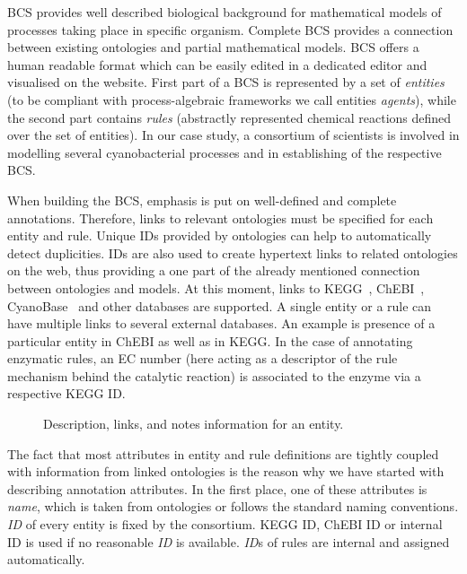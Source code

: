 \documentclass[12pt]{fithesis2}
\begin{document}
BCS provides well described biological background for mathematical models of processes taking place in specific organism. Complete BCS provides a connection between existing ontologies and partial mathematical models. BCS offers a human readable format which can be easily edited in a dedicated editor and visualised on the website. First part of a BCS is represented by a set of \emph{entities} (to be compliant with process-algebraic frameworks we call entities \emph{agents}), while the second part contains \emph{rules} (abstractly represented chemical reactions defined over the set of entities). In our case study, a consortium of scientists is involved in modelling several cyanobacterial processes and in establishing of the respective BCS.

When building the BCS, emphasis is put on well-defined and complete annotations. Therefore, links to relevant ontologies must be specified for each entity and rule. Unique IDs provided by ontologies can help to automatically detect duplicities. IDs are also used to create hypertext links to related ontologies on the web, thus providing a one part of the already mentioned connection between ontologies and models. At this moment, links to KEGG~\cite{Kanehisa04012016}, ChEBI~\cite{ChEBI}, CyanoBase~\cite{CyanoBase} and other databases are supported. A single entity or a rule can have multiple links to several external databases. An example is presence of a particular entity in ChEBI as well as in KEGG. In the case of annotating enzymatic rules, an EC number (here acting as a descriptor of the rule mechanism behind the catalytic reaction) is associated to the enzyme via a respective KEGG ID.

\begin{figure}[!h]
\begin{center}
\end{center}
\caption{Description, links, and notes information for an entity.}
\end{figure}

The fact that most attributes in entity and rule definitions are tightly coupled with information from linked ontologies is the reason why we have started with describing annotation attributes. In the first place, one of these attributes is \emph{name}, which is taken from ontologies or follows the standard naming conventions. \emph{ID} of every entity is fixed by the consortium. KEGG ID, ChEBI ID or internal ID is used if no reasonable \emph{ID} is available. \emph{ID}s of rules are internal and assigned automatically.
\end{document}
